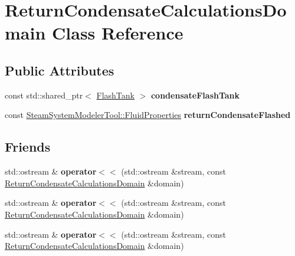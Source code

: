 \hypertarget{class_return_condensate_calculations_domain}{}\section{Return\+Condensate\+Calculations\+Domain Class Reference}
\label{class_return_condensate_calculations_domain}
\subsection*{Public Attributes}
\begin{DoxyCompactItemize}
\item 
\mbox{\label{class_return_condensate_calculations_domain_af3f39cec9b9d9d700a09cbdc64a6c29c}} 
const std\+::shared\+\_\+ptr$<$ \hyperlink{class_flash_tank}{Flash\+Tank} $>$ {\bfseries condensate\+Flash\+Tank}
\item 
\mbox{\label{class_return_condensate_calculations_domain_a212a6499918489c6e7f770b04123173b}} 
const \hyperlink{struct_steam_system_modeler_tool_1_1_fluid_properties}{Steam\+System\+Modeler\+Tool\+::\+Fluid\+Properties} {\bfseries return\+Condensate\+Flashed}
\end{DoxyCompactItemize}
\subsection*{Friends}
\begin{DoxyCompactItemize}
\item 
\mbox{\label{class_return_condensate_calculations_domain_a2b9e7cd98ff47dedfc3a02f79c8ef98a}} 
std\+::ostream \& {\bfseries operator$<$$<$} (std\+::ostream \&stream, const \hyperlink{class_return_condensate_calculations_domain}{Return\+Condensate\+Calculations\+Domain} \&domain)
\item 
\mbox{\label{class_return_condensate_calculations_domain_a2b9e7cd98ff47dedfc3a02f79c8ef98a}} 
std\+::ostream \& {\bfseries operator$<$$<$} (std\+::ostream \&stream, const \hyperlink{class_return_condensate_calculations_domain}{Return\+Condensate\+Calculations\+Domain} \&domain)
\item 
\mbox{\label{class_return_condensate_calculations_domain_a2b9e7cd98ff47dedfc3a02f79c8ef98a}} 
std\+::ostream \& {\bfseries operator$<$$<$} (std\+::ostream \&stream, const \hyperlink{class_return_condensate_calculations_domain}{Return\+Condensate\+Calculations\+Domain} \&domain)
\end{DoxyCompactItemize}


